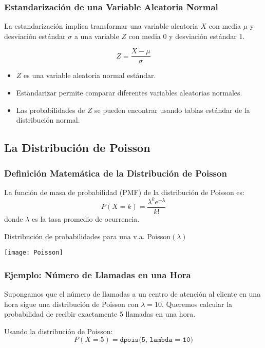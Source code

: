 \documentclass[aspectratio=169]{beamer}
\begin{document}
\begin{frame}
\frametitle{Estandarización de una Variable Aleatoria Normal}

La estandarización implica transformar una variable aleatoria \( X \) con media \( \mu \) y desviación estándar \( \sigma \) a una variable \( Z \) con media 0 y desviación estándar 1.

\[
Z = \frac{X - \mu}{\sigma}
\]

\begin{itemize}
    \item \( Z \) es una variable aleatoria normal estándar.
    \item Estandarizar permite comparar diferentes variables aleatorias normales.
    \item Las probabilidades de \( Z \) se pueden encontrar usando tablas estándar de la distribución normal.
\end{itemize}
\end{frame}





\subsection{La Distribución de Poisson}
\begin{frame}
\frametitle{Definición Matemática de la Distribución de Poisson}
La función de masa de probabilidad (PMF) de la distribución de Poisson es:
\[
P(X=k) = \frac{\lambda^k e^{-\lambda}}{k!}
\]
donde \(\lambda\) es la tasa promedio de ocurrencia.
\end{frame}


\begin{frame}
\begin{center}
\caption{Distribución de probabilidades para una v.a. Poisson$(\lambda)$}
\texttt{[image: Poisson]}
\end{center}
\end{frame}



\begin{frame}
\frametitle{Ejemplo: Número de Llamadas en una Hora}
Supongamos que el número de llamadas a un centro de atención al cliente en una hora sigue una distribución de Poisson con \(\lambda = 10\). Queremos calcular la probabilidad de recibir exactamente 5 llamadas en una hora.

Usando la distribución de Poisson:
\[
P(X = 5) = \texttt{dpois(5, lambda = 10)}
\]
\end{frame}
\end{document}
